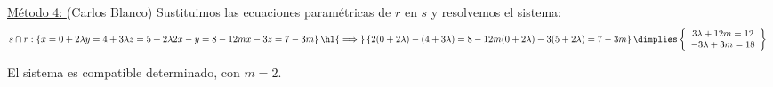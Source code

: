 \documentclass[palatino,nosec,nochap,nobuilddate]{Docencia}
\begin{document}
\begin{problem}
\ul{Método 4: } (Carlos Blanco)
Sustituimos las ecuaciones paramétricas de $r$ en $s$ y resolvemos el sistema:
\[
s\cap r: 
\left\{
	x = 0+2\lambda\\
	y = 4+3\lambda\\
	z = 5+2\lambda\\
	2x-y=8-12m\\
	x-3z = 7-3m	
\right\}\hl{\implies}
\left\{
	2(0+2\lambda)-(4+3\lambda)=8-12m\\
	(0+2\lambda)-3(5+2\lambda) = 7-3m	
\right\} \dimplies 
\left\{
	\begin{array}{c}
		3\lambda + 12m = 12\\
		-3\lambda + 3m = 18
	\end{array}	
\right\}\
\]

El sistema es compatible determinado, con $m=2$.

\end{problem}
\end{document}
